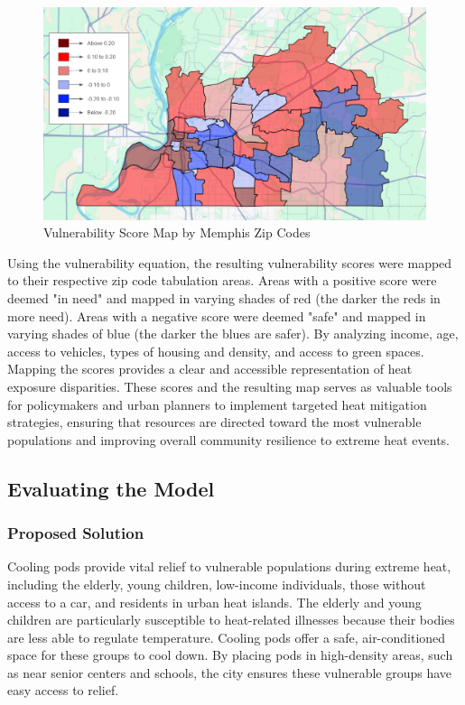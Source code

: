 \documentclass[12pt]{article}
\begin{document}
\begin{figure}[H]
\centering
\includegraphics[scale=0.5]{Screenshot 2025-03-03 211358.png}
\caption{Vulnerability Score Map by Memphis Zip Codes}
\end{figure}

\par 
Using the vulnerability equation, the resulting vulnerability scores were mapped to their respective zip code tabulation areas. Areas with a positive score were deemed "in need" and mapped in varying shades of red (the darker the reds in more need). Areas with a negative score were deemed "safe" and mapped in varying shades of blue (the darker the blues are safer). By analyzing income, age, access to vehicles, types of housing and density, and access to green spaces. Mapping the scores provides a clear and accessible representation of heat exposure disparities. These scores and the resulting map serves as valuable tools for policymakers and urban planners to implement targeted heat mitigation strategies, ensuring that resources are directed toward the most vulnerable populations and improving overall community resilience to extreme heat events.











\subsection{Evaluating the Model}
\subsubsection{Proposed Solution}
\par Cooling pods provide vital relief to vulnerable populations during extreme heat, including the elderly, young children, low-income individuals, those without access to a car, and residents in urban heat islands. The elderly and young children are particularly susceptible to heat-related illnesses because their bodies are less able to regulate temperature. Cooling pods offer a safe, air-conditioned space for these groups to cool down. By placing pods in high-density areas, such as near senior centers and schools, the city ensures these vulnerable groups have easy access to relief.
\end{document}
